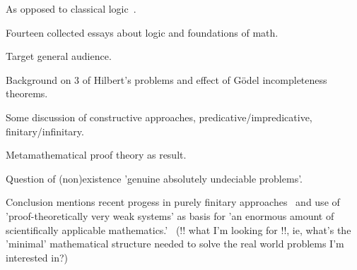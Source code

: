 \cite{Feferman:2000,Diez:2002,sep:mathematics_constructive,
wiki:Constructivism_philosophy_of_mathematics}

As opposed to classical logic~\cite{wiki:Classical_logic}.

\label{sec:Feferman}
\cite{Feferman1998LightOfLogic,Feferman:2000}

\label{sec:In_the_light_of_logic}

Fourteen collected essays about logic and foundations of 
math.~\cite{Feferman1998LightOfLogic}

\label{sec:Deciding_the_undecidable}

\cite[ch.~1 ``Deciding the undecidable'']{Feferman1998LightOfLogic}

Target general audience.

Background on $3$ of Hilbert's problems
and effect of G\"{o}del incompleteness theorems.

Some discussion of constructive approaches, 
predicative/impredicative, finitary/infinitary.

Metamathematical proof theory as result.

Question of (non)existence 
'genuine absolutely undeciable problems'.

Conclusion mentions recent progess
in purely finitary approaches~\cite[ch.~10]{Feferman1998LightOfLogic}
and 
use of 'proof-theoretically very weak systems'
as basis for 'an enormous amount of scientifically applicable
mathematics.'~\cite[ch.~14]{Feferman1998LightOfLogic}
(!! what I'm looking for !!, ie, 
what's the 'minimal' mathematical structure needed to
solve the real world problems I'm interested in?)

\label{sec:Is_Cantor_Necessary}

\cite{Feferman1989CantorNecessary}
\cite[ch.~2 ``Is Cantor necessary?'']{Feferman1998LightOfLogic}

